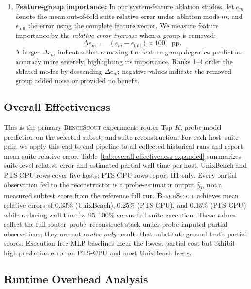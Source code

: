 \documentclass[sigplan,10pt]{acmart}
\newcommand{\ourmethod}{\textsc{BenchScout}\xspace}
\newcommand{\ptscpu}{PTS-CPU}
\newcommand{\ptsgpu}{PTS-GPU}
\begin{document}
\begin{enumerate}
    \item \textbf{Feature-group importance:} In our system-feature ablation studies, let \(e_m\) denote the mean out-of-fold suite relative error under ablation mode \(m\), and \(e_{\mathrm{full}}\) the error using the complete feature vector. We measure feature importance by the \emph{relative-error increase} when a group is removed:
    \begin{equation}
    \label{eq:xi-importance}
    \Delta e_m \;=\; (e_m - e_{\mathrm{full}}) \times 100 \quad \mathrm{pp}.
    \end{equation}
    A larger \(\Delta e_m\) indicates that removing the feature group degrades prediction accuracy more severely, highlighting its importance. Ranks 1--4 order the ablated modes by descending \(\Delta e_m\); negative values indicate the removed group added noise or provided no benefit.
\end{enumerate}

\subsection{Overall Effectiveness}
\label{subsec:overall-effectiveness}

This is the primary \ourmethod{} experiment: router Top-$K$, probe-model prediction on the selected subset, and suite reconstruction.
For each host--suite pair, we apply this end-to-end pipeline to all collected historical runs and report mean suite relative error.
Table~\ref{tab:overall-effectiveness-expanded} summarizes suite-level relative error and estimated partial wall time per host.
UnixBench and \ptscpu{} rows cover five hosts; \ptsgpu{} rows report H1 only.
Every partial observation fed to the reconstructor is a probe-estimator output $\hat{y}_j$, not a measured subtest score from the reference full run.
\ourmethod achieves mean relative errors of $0.33\%$ (UnixBench), $0.25\%$ (\ptscpu), and $0.18\%$ (\ptsgpu) while reducing wall time by 95--100\% versus full-suite execution.
These values reflect the full router--probe--reconstruct stack under probe-imputed partial observations; they are not \emph{router only} results that substitute ground-truth partial scores.
Execution-free MLP baselines incur the lowest partial cost but exhibit high prediction error on \ptscpu{} and most UnixBench hosts.

\subsection{Runtime Overhead Analysis}
\label{subsec:resource-waveforms}
\end{document}
